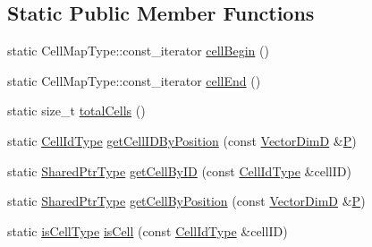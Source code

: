 \subsection*{Static Public Member Functions}
\begin{DoxyCompactItemize}
\item 
static Cell\+Map\+Type\+::const\+\_\+iterator \hyperlink{structmodel_1_1_spatial_cell_observer_a040e9231e8149d96803c46279ed31d82}{cell\+Begin} ()
\item 
static Cell\+Map\+Type\+::const\+\_\+iterator \hyperlink{structmodel_1_1_spatial_cell_observer_a58ef2237ad9b95350b1562d70fa151cf}{cell\+End} ()
\item 
static size\+\_\+t \hyperlink{structmodel_1_1_spatial_cell_observer_ad7b5ded013db11e298fc85c29648ded7}{total\+Cells} ()
\item 
static \hyperlink{structmodel_1_1_spatial_cell_observer_a4463a457f13bd480c87facc50799832b}{Cell\+Id\+Type} \hyperlink{structmodel_1_1_spatial_cell_observer_afa80a3acba71b828842bc3ac1b68eb1d}{get\+Cell\+I\+D\+By\+Position} (const \hyperlink{structmodel_1_1_spatial_cell_observer_a9b73220477f451fa7981e2597f23614b}{Vector\+Dim\+D} \&\hyperlink{_f_e_m_2linear__elasticity__3d_2tetgen_2generate_p_o_l_ycube_8m_a50a9afb44201a65ab7ad5feb2150aeb6}{P})
\item 
static \hyperlink{structmodel_1_1_spatial_cell_observer_ae879e58433ae1725fa700b08b790b2cd}{Shared\+Ptr\+Type} \hyperlink{structmodel_1_1_spatial_cell_observer_abf145145094f568f68b3edf6a52f104f}{get\+Cell\+By\+I\+D} (const \hyperlink{structmodel_1_1_spatial_cell_observer_a4463a457f13bd480c87facc50799832b}{Cell\+Id\+Type} \&cell\+I\+D)
\item 
static \hyperlink{structmodel_1_1_spatial_cell_observer_ae879e58433ae1725fa700b08b790b2cd}{Shared\+Ptr\+Type} \hyperlink{structmodel_1_1_spatial_cell_observer_a7c15f14c52447f8038602b16447e4019}{get\+Cell\+By\+Position} (const \hyperlink{structmodel_1_1_spatial_cell_observer_a9b73220477f451fa7981e2597f23614b}{Vector\+Dim\+D} \&\hyperlink{_f_e_m_2linear__elasticity__3d_2tetgen_2generate_p_o_l_ycube_8m_a50a9afb44201a65ab7ad5feb2150aeb6}{P})
\item 
static \hyperlink{structmodel_1_1_spatial_cell_observer_a8308b4c6ce9d94f1f29b80a41e3374b5}{is\+Cell\+Type} \hyperlink{structmodel_1_1_spatial_cell_observer_a8356953ed0ad046efd4957d08df93d3c}{is\+Cell} (const \hyperlink{structmodel_1_1_spatial_cell_observer_a4463a457f13bd480c87facc50799832b}{Cell\+Id\+Type} \&cell\+I\+D)
\item 

\end{DoxyCompactItemize}
